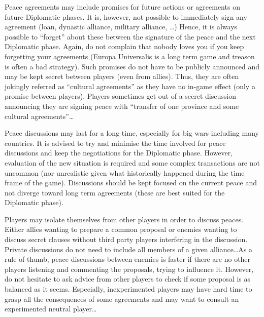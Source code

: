 \bparag Peace agreements may include promises for future actions or agreements
on future Diplomatic phases.
\bparag It is, however, not possible to immediately sign any agreement (loan,
dynastic alliance, military alliance, \ldots) Hence, it is always possible to
``forget'' about these between the signature of the peace and the next
Diplomatic phase. Again, do not complain that nobody loves you if you keep
forgetting your agreements (Europa Universalis is a long term game and treason
is often a bad strategy).
\bparag Such promises do not have to be publicly announced and may be kept
secret between players (even from allies). Thus, they are often jokingly
referred as ``cultural agreements'' as they have no in-game effect (only a
promise between players). Players sometimes get out of a secret discussion
announcing they are signing peace with ``transfer of one province and some
cultural agreements''\ldots

\begin{playtip}
  Peace discussions may last for a long time, especially for big wars
  including many countries. It is advised to try and minimise the time
  involved for peace discussions and keep the negotiations for the Diplomatic
  phase. However, evaluation of the new situation is required and some complex
  transactions are not uncommon (nor unrealistic given what historically
  happened during the time frame of the game). Discussions should be kept
  focused on the current peace and not diverge toward long term agreements
  (these are best suited for the Diplomatic phase).

  Players may isolate themselves from other players in order to discuss
  peaces. Either allies wanting to prepare a common proposal or enemies
  wanting to discuss secret clauses without third party players interfering in
  the discussion. Private discussions do not need to include all members of a
  given alliance\ldots As a rule of thumb, peace discussions between enemies
  is faster if there are no other players listening and commenting the
  proposals, trying to influence it. However, do not hesitate to ask advice
  from other players to check if some proposal is as balanced as it
  seems. Especially, inexperimented players may have hard time to grasp all
  the consequences of some agreements and may want to consult an experimented
  neutral player\ldots
\end{playtip}


